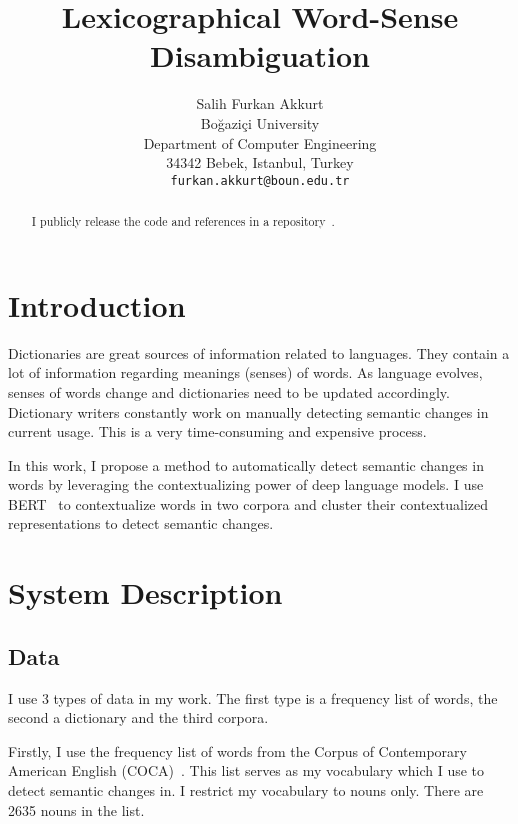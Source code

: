 \documentclass[11pt]{article}
\title{Lexicographical Word-Sense Disambiguation}
\author{Salih Furkan Akkurt \\
  Boğaziçi University \\
  Department of Computer Engineering \\
  34342 Bebek, Istanbul, Turkey \\
  {\tt furkan.akkurt@boun.edu.tr} \\}
\date{}
\begin{document}
\maketitle
\begin{abstract}
  I publicly release the code and references in a repository~\cite{akkurt-2023-58t-app-repo}.
\end{abstract}

\section{Introduction}

Dictionaries are great sources of information related to languages.
They contain a lot of information regarding meanings (senses) of words.
As language evolves, senses of words change and dictionaries need to be updated accordingly.
Dictionary writers constantly work on manually detecting semantic changes in current usage.
This is a very time-consuming and expensive process.

In this work, I propose a method to automatically detect semantic changes in words by leveraging the contextualizing power of deep language models.
I use BERT~\cite{devlin-etal-2019-bert} to contextualize words in two corpora and cluster their contextualized representations to detect semantic changes.



\section{System Description}

\subsection{Data}

I use 3 types of data in my work.
The first type is a frequency list of words, the second a dictionary and the third corpora.

Firstly, I use the frequency list of words from the Corpus of Contemporary American English (COCA)~\cite{english-corpora-2008-coca}.
This list serves as my vocabulary which I use to detect semantic changes in.
I restrict my vocabulary to nouns only.
There are 2635 nouns in the list.
\end{document}
